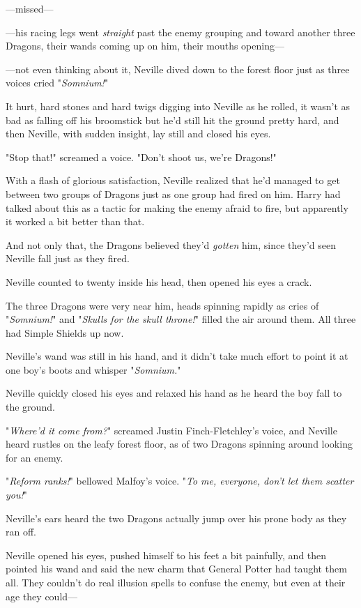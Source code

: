 ---missed---

---his racing legs went \emph{straight} past the enemy grouping and toward
another three Dragons, their wands coming up on him, their mouths opening---

---not even thinking about it, Neville dived down to the forest floor just as
three voices cried "\emph{Somnium!}"

It hurt, hard stones and hard twigs digging into Neville as he rolled, it
wasn't as bad as falling off his broomstick but he'd still hit the ground
pretty hard, and then Neville, with sudden insight, lay still and closed his
eyes.

"Stop that!" screamed a voice. "Don't shoot us, we're Dragons!"

With a flash of glorious satisfaction, Neville realized that he'd managed to
get between two groups of Dragons just as one group had fired on him. Harry had
talked about this as a tactic for making the enemy afraid to fire, but
apparently it worked a bit better than that.

And not only that, the Dragons believed they'd \emph{gotten} him, since they'd
seen Neville fall just as they fired.

Neville counted to twenty inside his head, then opened his eyes a crack.

The three Dragons were very near him, heads spinning rapidly as cries of
"\emph{Somnium!}" and "\emph{Skulls for the skull throne!}" filled the air
around them. All three had Simple Shields up now.

Neville's wand was still in his hand, and it didn't take much effort to point
it at one boy's boots and whisper "\emph{Somnium.}"

Neville quickly closed his eyes and relaxed his hand as he heard the boy fall
to the ground.

"\emph{Where'd it come from?}" screamed Justin Finch-Fletchley's voice, and
Neville heard rustles on the leafy forest floor, as of two Dragons spinning
around looking for an enemy.

"\emph{Reform ranks!}" bellowed Malfoy's voice. "\emph{To me, everyone, don't
let them scatter you!}"

Neville's ears heard the two Dragons actually jump over his prone body as they
ran off.

Neville opened his eyes, pushed himself to his feet a bit painfully, and then
pointed his wand and said the new charm that General Potter had taught them
all. They couldn't do real illusion spells to confuse the enemy, but even at
their age they could---

